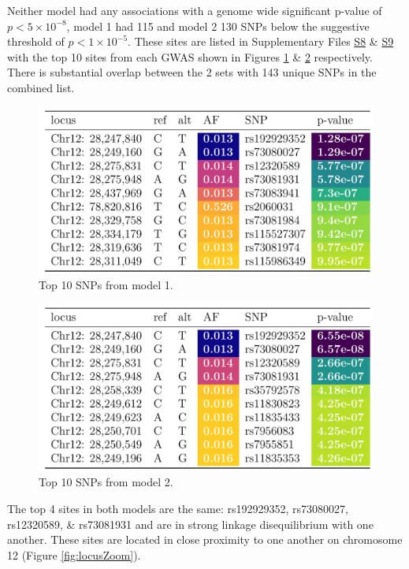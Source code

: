 \documentclass[
]{book}
\begin{document}
Neither model had any associations with a genome wide significant p-value of \(p < 5\times10^{-8}\), model 1 had 115 and model 2 130 SNPs below the suggestive threshold of \(p < 1\times10^{-5}\).
These sites are listed in Supplementary Files \href{./Supplementary_Files/SF8_suggestivem1full.tsv}{S8} \& \href{./Supplementary_Files/SF9_suggestivem2full.tsv}{S9} with the top 10 sites from each GWAS shown in Figures \ref{fig:m1tab} \& \ref{fig:m2tab} respectively.
There is substantial overlap between the 2 sets with 143 unique SNPs in the combined list.

\begin{figure}

{\centering \includegraphics[width=0.6\linewidth]{./figs/top10_pretty_m1} 

}

\caption{Top 10 SNPs from model 1.}\label{fig:m1tab}
\end{figure}



\begin{figure}

{\centering \includegraphics[width=0.6\linewidth]{./figs/top10_pretty_m2} 

}

\caption{Top 10 SNPs from model 2.}\label{fig:m2tab}
\end{figure}



The top 4 sites in both models are the same: rs192929352, rs73080027, rs12320589, \& rs73081931 and are in strong linkage disequilibrium with one another.
These sites are located in close proximity to one another on chromosome 12 (Figure \ref{fig:locusZoom}).
\end{document}
